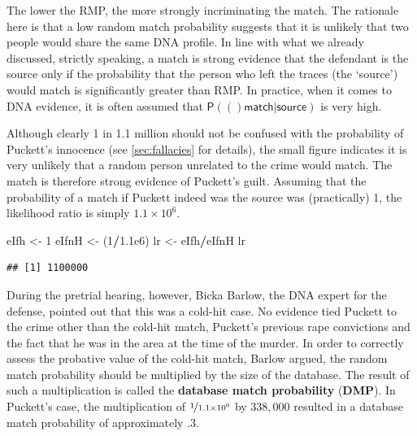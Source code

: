 \documentclass[10pt,dvipsnames,enabledeprecatedfontcommands]{scrartcl}
\newenvironment{Shaded}{\begin{snugshade}}{\end{snugshade}}
\newcommand{\DecValTok}[1]{\textcolor[rgb]{0.00,0.00,0.81}{#1}}
\newcommand{\FloatTok}[1]{\textcolor[rgb]{0.00,0.00,0.81}{#1}}
\newcommand{\NormalTok}[1]{#1}
\newcommand{\OperatorTok}[1]{\textcolor[rgb]{0.81,0.36,0.00}{\textbf{#1}}}
\newcommand{\StringTok}[1]{\textcolor[rgb]{0.31,0.60,0.02}{#1}}
\newcommand{\pr}[1]{\mathsf{P}(#1)}
\begin{document}
The lower the RMP, the more strongly incriminating the match. The
rationale here is that a low random match probability suggests that it
is unlikely that two people would share the same DNA profile. In line
with what we already discussed, strictly speaking, a match is strong
evidence that the defendant is the source only if the probability that
the person who left the traces (the `source') would match is
significantly greater than RMP. In practice, when it comes to DNA
evidence, it is often assumed that
\(\pr(\textsf{match} \vert \textsf{source})\) is very high.

Although clearly 1 in 1.1 million should not be confused with the
probability of Puckett's innocence (see \ref{sec:fallacies} for
details), the small figure indicates it is
very unlikely that a random person unrelated to the crime would match.
The match is therefore strong evidence of Puckett's guilt. Assuming that
the probability of a match if Puckett indeed was the source was
(practically) 1, the likelihood ratio is simply \(1.1 \times 10^6\).


\begin{Shaded}
\begin{Highlighting}[]
\NormalTok{eIfh <-}\StringTok{ }\DecValTok{1}
\NormalTok{eIfnH <-}\StringTok{ }\NormalTok{(}\DecValTok{1}\OperatorTok{/}\FloatTok{1.1e6}\NormalTok{)}
\NormalTok{lr <-}\StringTok{ }\NormalTok{eIfh}\OperatorTok{/}\NormalTok{eIfnH}
\NormalTok{lr}
\end{Highlighting}
\end{Shaded}

\begin{verbatim}
## [1] 1100000
\end{verbatim}

During the pretrial hearing, however, Bicka Barlow, the DNA expert for
the defense, pointed out that this was a cold-hit case. No evidence tied
Puckett to the crime other than the cold-hit match, Puckett's previous
rape convictions and the fact that he was in the area at the time of the
murder. In order to correctly assess the probative value of the cold-hit
match, Barlow argued, the random match probability should be multiplied
by the size of the database. The result of such a multiplication is
called the \textbf{database match probability} (\textbf{DMP}). In
Puckett's case, the multiplication of \(\nicefrac{1}{1.1\times 10^6}\)
by \(338,000\) resulted in a database match probability of approximately
.3.
\end{document}
